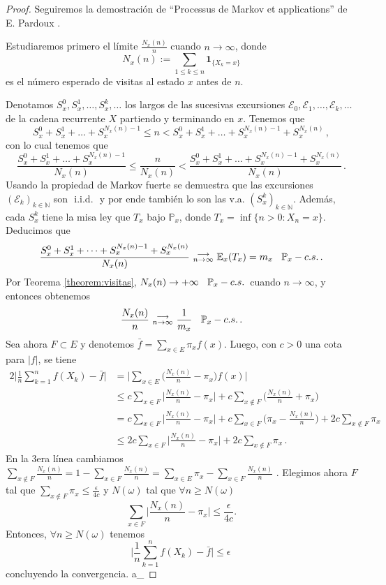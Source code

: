 \documentclass[letterpaper,11pt]{article} %
\def\espacio{\hspace{.25cm}\,}
\theoremstyle{defbreak}
\theoremstyle{propbreak}
\theoremstyle{remark}
\theoremstyle{break}
\def\E{\mathbb{E}}
\def\P{\mathbb{P}}
\def\N{\mathbb{N}}
\def\conv{\mbox{ }\substack{\longrightarrow \\ n\to\infty}\mbox{ }}
\def\iid{\mbox{ i.i.d. }}
\def\gris{\color{mygray}}
\def\negro{\color{black}}
\def\findem{\null\hfill\color{white}a\color{black}_\square}
\begin{document}
\begin{proof}
\gris Seguiremos la demostración de ``Processus de Markov et applications'' %
de E. Pardoux \cite{pardoux}.

Estudiaremos primero el límite $\displaystyle\frac{N_x(n)}{n}$ cuando $n\to\infty$, donde
$$ N_x(n):=\displaystyle\sum_{1\leq k\leq n}\mathbf{1}_{\{X_k=x\}}$$
es el número esperado de visitas al estado $x$ antes de $n$.

Denotamos $S^0_x,S^1_x,\dots,S^k_x,\dots$ los largos de las sucesivas excursiones $\mathcal{E}_0,\mathcal{E}_1,\dots,\mathcal{E}_k,\dots$ de la cadena recurrente $X$  partiendo y terminando en $x$. Tenemos que
$$ S^0_x+S^1_x+\dots+S^{N_x(n)-1}_x \leq n < S^0_x+S^1_x+\dots+S^{N_x(n)-1}_x+S^{N_x(n)}_x \, ,$$
con lo cual tenemos que
$$ \displaystyle \frac{S^0_x+S^1_x+\dots+S^{N_x(n)-1}_x}{N_x(n)} \leq \frac{n}{N_x(n)} < \frac{S^0_x+S^1_x+\dots+S^{N_x(n)-1}_x+S^{N_x(n)}_x}{N_x(n)} \,. $$
Usando la propiedad de Markov fuerte se demuestra que las excursiones $(\mathcal{E}_k)_{k\in\N}$ son $\iid$ y por ende también lo son las v.a.  $(S_x^k)_{k\in\N}$. Adem\'as, cada $S_x^k$ tiene la misa ley que $T_x$ bajo $\P_x$, donde $T_x = \inf\{n > 0: X_n = x\}$. Deducimos que 
$$ \frac{S^0_x+S^1_x+\dots+S^{N_x(n)-1}_x+S^{N_x(n)}_x}{N_x(n)} \conv \E_x(T_x)=m_x \espacio \P_x-c.s. \, .$$
Por Teorema \ref{theorem:visitas}, $N_x(n)\to + \infty \espacio \P_x-c.s. \,$ cuando $n\to \infty$, y entonces obtenemos
$$ \displaystyle \frac{N_x(n)}{n}\conv \frac{1}{m_x} \espacio \P_x-c.s. \,.$$
Sea ahora $F\subset E$ y denotemos $\bar f = \displaystyle \sum_{x\in E}\pi_x f(x)$. Luego, con $c>0$ una cota para $|f|$, se tiene
\begin{alignat*}{2}
\bigg| \frac{1}{n}\sum^n_{k=1}f(X_k)-\bar f\bigg| & = \bigg|\sum_{x\in E}\bigg( \frac{N_x(n)}{n}-\pi_x \bigg)f(x)\bigg|\\
& \leq c\sum_{x\in F}\bigg|\frac{N_x(n)}{n}-\pi_x\bigg|+c\sum_{x\notin F}\bigg(\frac{N_x(n)}{n}+\pi_x\bigg) \\
& = c\sum_{x\in F}\bigg|\frac{N_x(n)}{n}-\pi_x\bigg|+c\sum_{x\in F}\bigg(\pi_x-\frac{N_x(n)}{n}\bigg)+2c\sum_{x\notin F}\pi_x \\
& \leq 2c\sum_{x\in F}\bigg|\frac{N_x(n)}{n}-\pi_x \bigg|+2c\sum_{x\notin F}\pi_x \, .
\end{alignat*}
En la 3era l\'inea cambiamos $\sum_{x\notin F} \frac{N_x(n)}{n} = 1 - \sum_{x\in F}  \frac{N_x(n)}{n} = \sum_{x\in E}  \pi_x - \sum_{x\in F}  \frac{N_x(n)}{n}  $ . Elegimos ahora $F$ tal que $\displaystyle \sum_{x\notin F}\pi_x\leq\frac{\epsilon}{4c}$ y $N(\omega)$ tal que $\forall n\geq N(\omega)$ 
$$ \sum_{x\in F}\bigg|\frac{N_x(n)}{n}-\pi_x\bigg|\leq\frac{\epsilon}{4c}. $$
Entonces, $\forall n\geq N(\omega)$ tenemos $$ \bigg| \frac{1}{n}\sum^n_{k=1}f(X_k)-\bar f\bigg|\leq\epsilon \, $$
concluyendo  la convergencia. \findem
\negro
\end{proof}
\end{document}
